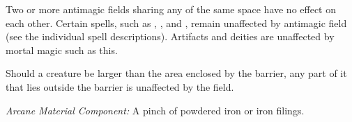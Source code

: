 Two or more antimagic fields sharing any of the same space have no effect 
on each other. Certain spells, such as , , 
and , remain unaffected by antimagic field (see 
the individual spell descriptions). Artifacts and deities are unaffected by mortal 
magic such as this. 

Should a creature be larger than the area enclosed by the barrier, any part of 
it that lies outside the barrier is unaffected by the field.

\textit{Arcane Material Component:} A pinch of powdered iron or iron filings.

